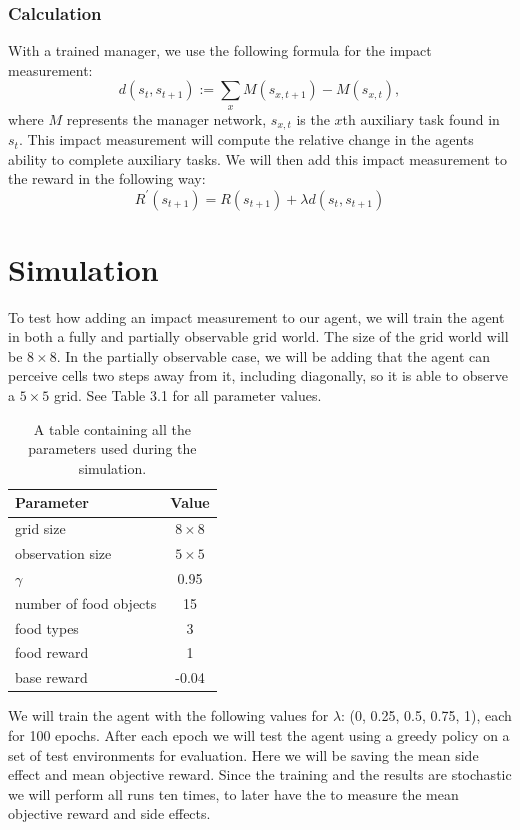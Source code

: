\documentclass[12pt,A4]{report}
\theoremstyle{definition}
\begin{document}
\subsubsection{Calculation}
With a trained manager, we use the following formula for the impact measurement:
\[ d(s_t,s_{t+1}) := \sum_x M(s_{x,t+1}) - M(s_{x,t}), \]
where $M$ represents the manager network, $s_{x,t}$ is the $x$th auxiliary task found in $s_t$. This impact measurement will compute the relative change in the agents ability to complete auxiliary tasks. We will then add this impact measurement to the reward in the following way: 
\[ R^{\prime}(s_{t+1}) = R(s_{t+1}) + \lambda d(s_t,s_{t+1})\]



\section{Simulation}
To test how adding an impact measurement to our agent, we will train the agent in both a fully and partially observable grid world. The size of the grid world will be $8\times8$. In the partially observable case, we will be adding that the agent can perceive cells two steps away from it, including diagonally, so it is able to observe a $5\times5$ grid. See Table 3.1 for all parameter values.

\begin{table}[H]
  \centering
  \begin{tabular}{l | c}
    Parameter& Value \\ \hline
    grid size & $8 \times  8$ \\
    observation size & $5 \times  5$ \\
    $\gamma$ & 0.95 \\
    number of food objects & 15 \\
    food types & 3 \\
    food reward & 1 \\
    base reward & -0.04 \\
  \end{tabular}
  \caption{A table containing all the parameters used during the simulation.}
  \label{tab:sim_parms}
\end{table}

We will train the agent with the following values for $\lambda$: (0, 0.25, 0.5, 0.75, 1), each for 100 epochs. After each epoch we will test the agent using a greedy policy on a set of test environments for evaluation. Here we will be saving the mean side effect and mean objective reward. Since the training and the results are stochastic we will perform all runs ten times, to later have the to measure the mean objective reward and side effects.
\end{document}
